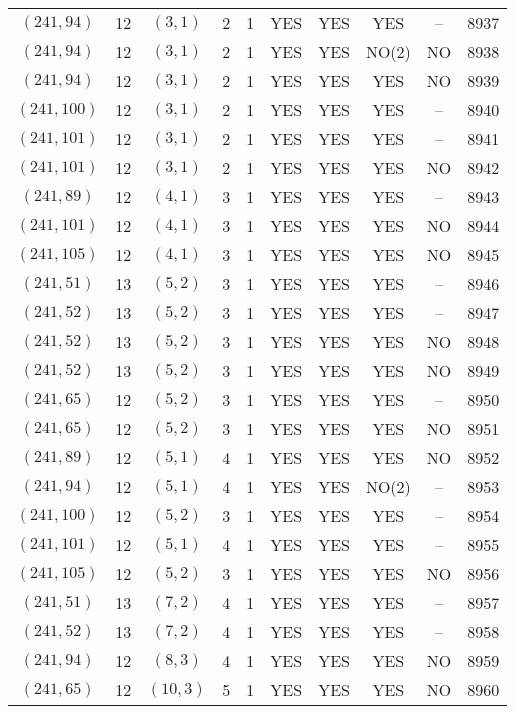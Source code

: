 \begin{longtable}{|c|c|c|c|c|c|c|c|c|c|}
$(241, 94)$ & 12 & $(3, 1)$ & 2 & 1 & YES & YES & YES & -- & 8937\\
$(241, 94)$ & 12 & $(3, 1)$ & 2 & 1 & YES & YES & NO(2) & NO & 8938\\
$(241, 94)$ & 12 & $(3, 1)$ & 2 & 1 & YES & YES & YES & NO & 8939\\
$(241, 100)$ & 12 & $(3, 1)$ & 2 & 1 & YES & YES & YES & -- & 8940\\
$(241, 101)$ & 12 & $(3, 1)$ & 2 & 1 & YES & YES & YES & -- & 8941\\
$(241, 101)$ & 12 & $(3, 1)$ & 2 & 1 & YES & YES & YES & NO & 8942\\
$(241, 89)$ & 12 & $(4, 1)$ & 3 & 1 & YES & YES & YES & -- & 8943\\
$(241, 101)$ & 12 & $(4, 1)$ & 3 & 1 & YES & YES & YES & NO & 8944\\
$(241, 105)$ & 12 & $(4, 1)$ & 3 & 1 & YES & YES & YES & NO & 8945\\
$(241, 51)$ & 13 & $(5, 2)$ & 3 & 1 & YES & YES & YES & -- & 8946\\
$(241, 52)$ & 13 & $(5, 2)$ & 3 & 1 & YES & YES & YES & -- & 8947\\
$(241, 52)$ & 13 & $(5, 2)$ & 3 & 1 & YES & YES & YES & NO & 8948\\
$(241, 52)$ & 13 & $(5, 2)$ & 3 & 1 & YES & YES & YES & NO & 8949\\
$(241, 65)$ & 12 & $(5, 2)$ & 3 & 1 & YES & YES & YES & -- & 8950\\
$(241, 65)$ & 12 & $(5, 2)$ & 3 & 1 & YES & YES & YES & NO & 8951\\
$(241, 89)$ & 12 & $(5, 1)$ & 4 & 1 & YES & YES & YES & NO & 8952\\
$(241, 94)$ & 12 & $(5, 1)$ & 4 & 1 & YES & YES & NO(2) & -- & 8953\\
$(241, 100)$ & 12 & $(5, 2)$ & 3 & 1 & YES & YES & YES & -- & 8954\\
$(241, 101)$ & 12 & $(5, 1)$ & 4 & 1 & YES & YES & YES & -- & 8955\\
$(241, 105)$ & 12 & $(5, 2)$ & 3 & 1 & YES & YES & YES & NO & 8956\\
$(241, 51)$ & 13 & $(7, 2)$ & 4 & 1 & YES & YES & YES & -- & 8957\\
$(241, 52)$ & 13 & $(7, 2)$ & 4 & 1 & YES & YES & YES & -- & 8958\\
$(241, 94)$ & 12 & $(8, 3)$ & 4 & 1 & YES & YES & YES & NO & 8959\\
$(241, 65)$ & 12 & $(10, 3)$ & 5 & 1 & YES & YES & YES & NO & 8960\\

\end{longtable}
